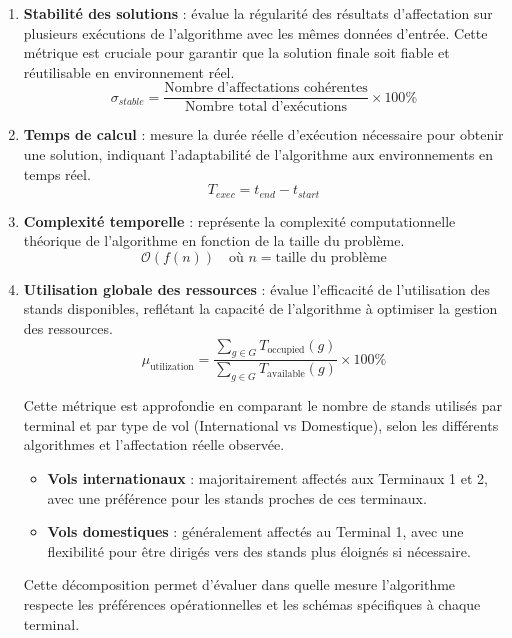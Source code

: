 \begin{enumerate}
	\item \textbf{Stabilité des solutions} : évalue la régularité des résultats d’affectation sur plusieurs exécutions de l’algorithme avec les mêmes données d’entrée. Cette métrique est cruciale pour garantir que la solution finale soit fiable et réutilisable en environnement réel.
	\begin{equation}
		\sigma_{stable} = \frac{\text{Nombre d'affectations cohérentes}}{\text{Nombre total d'exécutions}} \times 100\%
	\end{equation}
	
	\item \textbf{Temps de calcul} : mesure la durée réelle d’exécution nécessaire pour obtenir une solution, indiquant l’adaptabilité de l’algorithme aux environnements en temps réel.
	\begin{equation}
		T_{exec} = t_{end} - t_{start}
	\end{equation}
	
	\item \textbf{Complexité temporelle} : représente la complexité computationnelle théorique de l’algorithme en fonction de la taille du problème.
	\vspace{-1em}
	\begin{equation}
		\mathcal{O}(f(n)) \quad \text{où } n = \text{taille du problème}
	\end{equation}
	\vspace{-2em}
	\item \textbf{Utilisation globale des ressources} : évalue l’efficacité de l’utilisation des stands disponibles, reflétant la capacité de l’algorithme à optimiser la gestion des ressources.
	\begin{equation}
		\mu_{\text{utilization}} = \frac{\sum_{g \in G} T_{\text{occupied}}(g)}{\sum_{g \in G} T_{\text{available}}(g)} \times 100\%
	\end{equation}
	
	Cette métrique est approfondie en comparant le nombre de stands utilisés par terminal et par type de vol (International vs Domestique), selon les différents algorithmes et l’affectation réelle observée.
	
	\begin{itemize}
		\item \textbf{Vols internationaux} : majoritairement affectés aux Terminaux 1 et 2, avec une préférence pour les stands proches de ces terminaux.
		\item \textbf{Vols domestiques} : généralement affectés au Terminal 1, avec une flexibilité pour être dirigés vers des stands plus éloignés si nécessaire.
	\end{itemize}
	
	Cette décomposition permet d’évaluer dans quelle mesure l’algorithme respecte les préférences opérationnelles et les schémas spécifiques à chaque terminal.
\end{enumerate}
\vspace{-1em}
